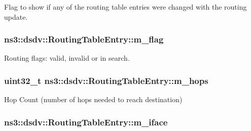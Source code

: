 Flag to show if any of the routing table entries were changed with the routing update. 

\subsubsection[{\texorpdfstring{m\+\_\+flag}{m_flag}}]{ ns3\+::dsdv\+::\+Routing\+Table\+Entry\+::m\+\_\+flag\hspace{0.3cm}{\ttfamily [private]}}\hypertarget{classns3_1_1dsdv_1_1RoutingTableEntry_a6702d7eb273d21926c81518fb400c761}{}\label{classns3_1_1dsdv_1_1RoutingTableEntry_a6702d7eb273d21926c81518fb400c761}


Routing flags\+: valid, invalid or in search. 

\subsubsection[{\texorpdfstring{m\+\_\+hops}{m_hops}}]{\setlength{\rightskip}{0pt plus 5cm}uint32\+\_\+t ns3\+::dsdv\+::\+Routing\+Table\+Entry\+::m\+\_\+hops\hspace{0.3cm}{\ttfamily [private]}}\hypertarget{classns3_1_1dsdv_1_1RoutingTableEntry_adc4e9a8003bcd5664369e04c8b3946c7}{}\label{classns3_1_1dsdv_1_1RoutingTableEntry_adc4e9a8003bcd5664369e04c8b3946c7}


Hop Count (number of hops needed to reach destination) 

\subsubsection[{\texorpdfstring{m\+\_\+iface}{m_iface}}]{ ns3\+::dsdv\+::\+Routing\+Table\+Entry\+::m\+\_\+iface\hspace{0.3cm}{\ttfamily [private]}}\hypertarget{classns3_1_1dsdv_1_1RoutingTableEntry_a8b5be8ca2915535589bb0839a7208aa3}{}\label{classns3_1_1dsdv_1_1RoutingTableEntry_a8b5be8ca2915535589bb0839a7208aa3}


